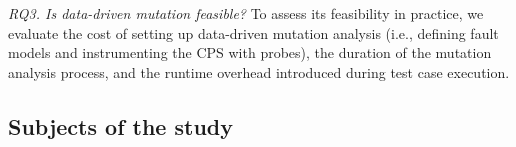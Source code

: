 \emph{RQ3.  Is data-driven mutation feasible?}
    To assess its feasibility in practice, we evaluate the cost of setting up data-driven mutation analysis (i.e., defining fault models and instrumenting the CPS with probes), {the duration of the mutation analysis process, and the} runtime overhead introduced during test case execution.


%
%
%
%


\subsection{Subjects of the study}

%


